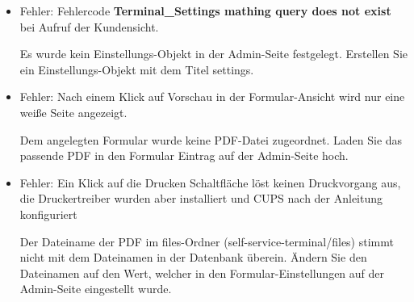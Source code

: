 \begin{itemize}
    \item Fehler: Fehlercode \textbf{Terminal\_Settings mathing query does not exist} bei Aufruf der Kundensicht.\par
    Es wurde kein Einstellungs-Objekt in der Admin-Seite festgelegt. Erstellen Sie ein Einstellungs-Objekt mit dem Titel \glqq settings\grqq{}.
    \item Fehler: Nach einem Klick auf \glqq Vorschau\grqq{} in der Formular-Ansicht wird nur eine weiße Seite angezeigt.\par
    Dem angelegten Formular wurde keine PDF-Datei zugeordnet. Laden Sie das passende PDF in den Formular Eintrag auf der Admin-Seite hoch.
    \item Fehler: Ein Klick auf die \glqq Drucken\grqq{} Schaltfläche löst keinen Druckvorgang aus, die Druckertreiber wurden aber installiert und CUPS nach der Anleitung konfiguriert\par
    Der Dateiname der PDF im files-Ordner (self-service-terminal/files) stimmt nicht mit dem Dateinamen in der Datenbank überein. Ändern Sie den Dateinamen auf den Wert, welcher in den Formular-Einstellungen auf der Admin-Seite eingestellt wurde.
\end{itemize}